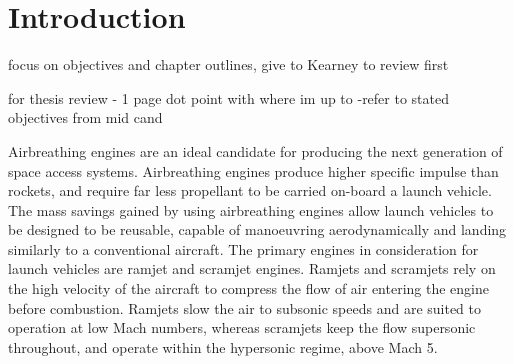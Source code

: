 
\cleardoublepage
\chapter{Introduction}

focus on objectives and chapter outlines,
give to Kearney to review first

for thesis review - 1 page dot point with where im up to
-refer to stated objectives from mid cand
  	
  	
  	  Airbreathing engines are an ideal candidate for producing the next generation of space access
  	systems. Airbreathing engines produce higher specific impulse than rockets, and require far less propellant to be carried on-board a launch vehicle.   	 
  	The mass savings gained by using airbreathing engines allow launch vehicles to be designed to be reusable, capable of manoeuvring aerodynamically and landing similarly to a conventional aircraft. 
  	The primary engines in consideration for launch vehicles are ramjet and scramjet engines.
  	Ramjets and scramjets rely on the high velocity of the aircraft to compress the flow of air entering the engine before combustion.  Ramjets slow the air to subsonic speeds and are suited to operation at low Mach numbers, whereas scramjets keep the flow supersonic throughout, and operate within the hypersonic regime, above Mach 5. 
  	
  	

  	 
  	 
